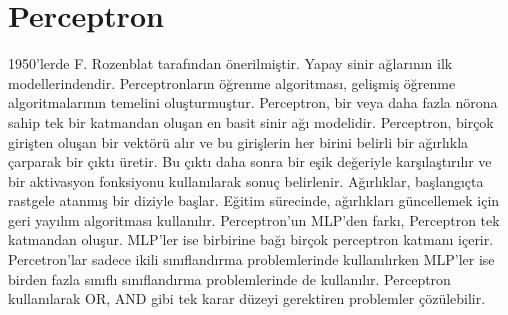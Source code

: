 \section{Perceptron}
1950'lerde F. Rozenblat tarafından önerilmiştir. Yapay sinir ağlarının ilk modellerindendir. Perceptronların öğrenme algoritması, gelişmiş öğrenme algoritmalarının temelini oluşturmuştur. Perceptron, bir veya daha fazla nörona sahip tek bir katmandan oluşan en basit sinir ağı modelidir. Perceptron, birçok girişten oluşan bir vektörü alır ve bu girişlerin her birini belirli bir ağırlıkla çarparak bir çıktı üretir. Bu çıktı daha sonra bir eşik değeriyle karşılaştırılır ve bir aktivasyon fonksiyonu kullanılarak sonuç belirlenir. Ağırlıklar, başlangıçta rastgele atanmış bir diziyle başlar. Eğitim sürecinde, ağırlıkları güncellemek için geri yayılım algoritması kullanılır. Perceptron'un MLP'den farkı, Perceptron tek katmandan oluşur. MLP'ler ise birbirine bağı birçok perceptron katmanı içerir. Percetron'lar sadece ikili sınıflandırma problemlerinde kullanılırken MLP'ler ise birden fazla sınıflı sınıflandırma problemlerinde de kullanılır. Perceptron kullanılarak OR, AND gibi tek karar düzeyi gerektiren problemler çözülebilir.

\newpage